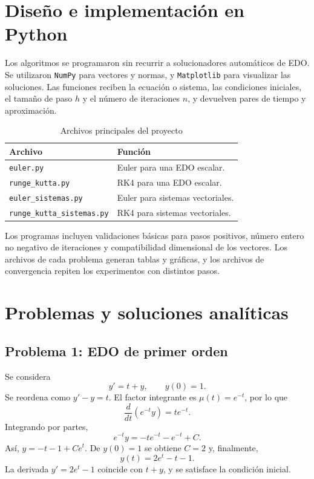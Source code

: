 \documentclass[12pt,letterpaper]{article}
\begin{document}
\section{Diseño e implementación en Python}
Los algoritmos se programaron sin recurrir a solucionadores automáticos de EDO. Se utilizaron \texttt{NumPy} para vectores y normas, y \texttt{Matplotlib} para visualizar las soluciones. Las funciones reciben la ecuación o sistema, las condiciones iniciales, el tamaño de paso $h$ y el número de iteraciones $n$, y devuelven pares de tiempo y aproximación.
\begin{table}[H]\centering\caption{Archivos principales del proyecto}\begin{tabular}{p{}p{}}\toprule
Archivo & Función\\\midrule
\texttt{euler.py} & Euler para una EDO escalar.\\
\texttt{runge\_kutta.py} & RK4 para una EDO escalar.\\
\texttt{euler\_sistemas.py} & Euler para sistemas vectoriales.\\
\texttt{runge\_kutta\_sistemas.py} & RK4 para sistemas vectoriales.\\
\bottomrule\end{tabular}\end{table}
Los programas incluyen validaciones básicas para pasos positivos, número entero no negativo de iteraciones y compatibilidad dimensional de los vectores. Los archivos de cada problema generan tablas y gráficas, y los archivos de convergencia repiten los experimentos con distintos pasos.
\section{Problemas y soluciones analíticas}
\subsection{Problema 1: EDO de primer orden}
Se considera
\begin{equation}y'=t+y,\qquad y(0)=1.\end{equation}
Se reordena como $y'-y=t$. El factor integrante es $\mu(t)=e^{-t}$, por lo que
\begin{equation}\frac{d}{dt}(e^{-t}y)=te^{-t}.\end{equation}
Integrando por partes,
\begin{equation}e^{-t}y=-te^{-t}-e^{-t}+C.\end{equation}
Así, $y=-t-1+Ce^t$. De $y(0)=1$ se obtiene $C=2$ y, finalmente,
\begin{equation}\boxed{y(t)=2e^t-t-1.}\end{equation}
La derivada $y'=2e^t-1$ coincide con $t+y$, y se satisface la condición inicial.
\end{document}
